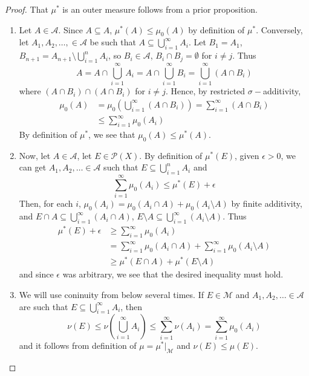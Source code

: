 \documentclass[12pt, a4paper]{memoir}
\theoremstyle{nonumberplain}
\newtheorem{proof}{Proof}
\begin{document}
\begin{proof}
    That $\mu^*$ is an outer measure follows from a prior proposition.
    \begin{enumerate}[label=(\roman*)]
        \item Let $A\in\mathcal{A}$.
            Since $A\subseteq A$, $\mu^*(A)\leq\mu_0(A)$ by definition of $\mu^*$.
            Conversely, let $A_1,A_2,\ldots,\in\mathcal{A}$ be such that $A\subseteq\bigcup_{i=1}^\infty A_i$.
            Let $B_1=A_1$, $B_{n+1}=A_{n+1}\setminus\bigcup_{i=1}^n A_i$, so $B_i\in\mathcal{A}$, $B_i\cap B_j=\emptyset$ for $i\neq j$.
            Thus
            \begin{equation*}
                A=A\cap\bigcup_{i=1}^\infty A_i=A\cap\bigcup_{i=1}^\infty B_i=\bigcup_{i=1}^\infty(A\cap B_i)
            \end{equation*}
            where $(A\cap B_i)\cap(A\cap B_i)$ for $i\neq j$.
            Hence, by restricted $\sigma-$additivity,
            \begin{align*}
                \mu_0(A) &= \mu_0\left(\bigcup_{i=1}^\infty(A\cap B_i)\right)=\sum\limits_{i=1}^\infty(A\cap B_i)\\
                         &\leq\sum\limits_{i=1}^\infty\mu_0(A_i)
            \end{align*}
            By definition of $\mu^*$, we see that $\mu_0(A)\leq\mu^*(A)$.
        \item Now, let $A\in\mathcal{A}$, let $E\in\mathcal{P}(X)$.
            By definition of $\mu^*(E)$, given $\epsilon>0$, we can get $A_1,A_2,\ldots\in\mathcal{A}$ such that $E\subseteq\bigcup_{i=1}^n A_i$ and
            \begin{equation*}
                \sum\limits_{i=1}^\infty \mu_0(A_i)\leq\mu^*(E)+\epsilon
            \end{equation*}
            Then, for each $i$, $\mu_0(A_i)=\mu_0(A_i\cap A)+\mu_0(A_i\setminus A)$ by finite additivity, and $E\cap A\subseteq\bigcup_{i=1}^\infty(A_i\cap A)$, $E\setminus A\subseteq\bigcup_{i=1}^\infty(A_i\setminus A)$.
            Thus
            \begin{align*}
                \mu^*(E)+\epsilon &\geq\sum\limits_{i=1}^\infty\mu_0(A_i)\\
                                  &= \sum\limits_{i=1}^\infty \mu_0(A_i\cap A)+\sum\limits_{i=1}^\infty \mu_0(A_i\setminus A)\\
                                  &\geq \mu^*(E\cap A)+\mu^*(E\setminus A)
            \end{align*}
            and since $\epsilon$ was arbitrary, we see that the desired inequality must hold.
        \item We will use coninuity from below several times.
            If $E\in\mathcal{M}$ and $A_1,A_2,\ldots\in\mathcal{A}$ are such that $E\subseteq\bigcup_{i=1}^\infty A_i$, then
            \begin{equation*}
                \nu(E)\leq\nu\left(\bigcup_{i=1}^\infty A_i\right)\leq\sum\limits_{i=1}^\infty \nu(A_i)=\sum\limits_{i=1}^\infty \mu_0(A_i)
            \end{equation*}
            and it follows from definition of $\mu=\mu^*|_{\mathcal{M}}$ and $\nu(E)\leq\mu(E)$.


\end{enumerate}
\end{proof}
\end{document}
